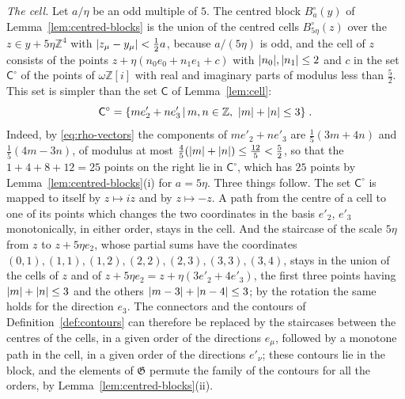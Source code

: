 \documentclass[11pt]{preprint}
\DeclarePairedDelimiter{\abs}{\lvert}{\rvert}
\numberwithin{equation}{section}
\theoremstyle{definition}
\theoremstyle{remark}
\theoremstyle{plain}
\begin{document}
\emph{The cell.} Let $a/\eta$ be an odd multiple of $5$. The centred block $B^\circ_a(y)$ of Lemma~\ref{lem:centred-blocks} is the union of the centred cells $B^\circ_{5\eta}(z)$ over the $z \in y + 5\eta\mathbb Z^4$ with $\abs{z_\mu - y_\mu} < \frac12a$, because $a/(5\eta)$ is odd, and the cell of $z$ consists of the points $z + \eta(n_0e_0 + n_1e_1 + c)$ with $\abs{n_0}, \abs{n_1} \leq 2$ and $c$ in the set $\mathsf C^\circ$ of the points of $\omega\mathbb Z[i]$ with real and imaginary parts of modulus less than $\frac52$. This set is simpler than the set $\mathsf C$ of Lemma~\ref{lem:cell}:
\begin{equation}\label{eq:centred-cell}
    \mathsf C^\circ = \{ me'_2 + ne'_3 \, | \, m, n \in \mathbb Z,\ \abs m + \abs n \leq 3 \}\;.
\end{equation}
Indeed, by \eqref{eq:rho-vectors} the components of $me'_2 + ne'_3$ are $\frac15(3m + 4n)$ and $\frac15(4m - 3n)$, of modulus at most $\frac45(\abs m + \abs n) \leq \frac{12}{5} < \frac52$, so that the $1 + 4 + 8 + 12 = 25$ points on the right lie in $\mathsf C^\circ$, which has $25$ points by Lemma~\ref{lem:centred-blocks}(i) for $a = 5\eta$. Three things follow. The set $\mathsf C^\circ$ is mapped to itself by $z \mapsto iz$ and by $z \mapsto -z$. A path from the centre of a cell to one of its points which changes the two coordinates in the basis $e'_2$, $e'_3$ monotonically, in either order, stays in the cell. And the staircase of the scale $5\eta$ from $z$ to $z + 5\eta e_2$, whose partial sums have the coordinates $(0, 1), (1, 1), (1, 2), (2, 2), (2, 3), (3, 3), (3, 4)$, stays in the union of the cells of $z$ and of $z + 5\eta e_2 = z + \eta(3e'_2 + 4e'_3)$, the first three points having $\abs m + \abs n \leq 3$ and the others $\abs{m - 3} + \abs{n - 4} \leq 3$; by the rotation the same holds for the direction $e_3$. The connectors and the contours of Definition~\ref{def:contours} can therefore be replaced by the staircases between the centres of the cells, in a given order of the directions $e_\mu$, followed by a monotone path in the cell, in a given order of the directions $e'_\nu$; these contours lie in the block, and the elements of $\mathfrak G$ permute the family of the contours for all the orders, by Lemma~\ref{lem:centred-blocks}(ii).
\end{document}
